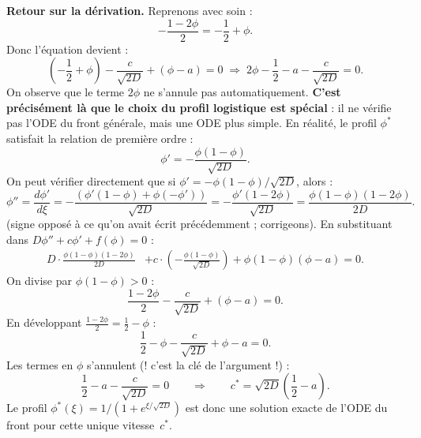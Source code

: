 \documentclass[11pt,a4paper]{report}
\begin{document}
\medskip
\noindent\textbf{Retour sur la d\'erivation.} Reprenons avec soin :
\begin{equation}
  -\frac{1-2\phi}{2} = -\frac{1}{2}+\phi.
\end{equation}
Donc l'\'equation devient :
\begin{equation}
  \left(-\frac{1}{2}+\phi\right) - \frac{c}{\sqrt{2D}} + (\phi-a) = 0
  \;\Longrightarrow\;
  2\phi - \frac{1}{2} - a - \frac{c}{\sqrt{2D}} = 0.
\end{equation}
On observe que le terme $2\phi$ ne s'annule pas automatiquement.
\textbf{C'est pr\'ecis\'ement l\`a que le choix du profil logistique est sp\'ecial} :
il ne v\'erifie pas l'ODE du front g\'en\'erale, mais une ODE plus simple.
En r\'ealit\'e, le profil $\phi^*$ satisfait la relation de premi\`ere ordre :
\begin{equation}
  \phi' = -\frac{\phi(1-\phi)}{\sqrt{2D}}.
\end{equation}
On peut v\'erifier directement que si $\phi' = -\phi(1-\phi)/\sqrt{2D}$, alors :
\begin{equation}
  \phi'' = \frac{d\phi'}{d\xi}
  = -\frac{(\phi'(1-\phi) + \phi(-\phi'))}{\sqrt{2D}}
  = -\frac{\phi'(1-2\phi)}{\sqrt{2D}}
  = \frac{\phi(1-\phi)(1-2\phi)}{2D}.
\end{equation}
(signe oppos\'e \`a ce qu'on avait \'ecrit pr\'ec\'edemment ; corrigeons).
En substituant dans $D\phi'' + c\phi' + f(\phi) = 0$ :
\begin{align}
  D \cdot \frac{\phi(1-\phi)(1-2\phi)}{2D}
  &+ c \cdot \left(-\frac{\phi(1-\phi)}{\sqrt{2D}}\right)
  + \phi(1-\phi)(\phi-a) = 0.
\end{align}
On divise par $\phi(1-\phi) > 0$ :
\begin{equation}
  \frac{1-2\phi}{2} - \frac{c}{\sqrt{2D}} + (\phi-a) = 0.
\end{equation}
En d\'eveloppant $\frac{1-2\phi}{2} = \frac{1}{2}-\phi$ :
\begin{equation}
  \frac{1}{2} - \phi - \frac{c}{\sqrt{2D}} + \phi - a = 0.
\end{equation}
Les termes en $\phi$ s'annulent (! c'est la cl\'e de l'argument !) :
\begin{equation}
  \frac{1}{2} - a - \frac{c}{\sqrt{2D}} = 0
  \qquad\Longrightarrow\qquad
  \boxed{c^* = \sqrt{2D}\left(\frac{1}{2}-a\right).}
\end{equation}
Le profil $\phi^*(\xi) = 1/(1+e^{\xi/\sqrt{2D}})$ est donc une solution exacte de
l'ODE du front pour cette unique vitesse~$c^*$.
\end{document}
